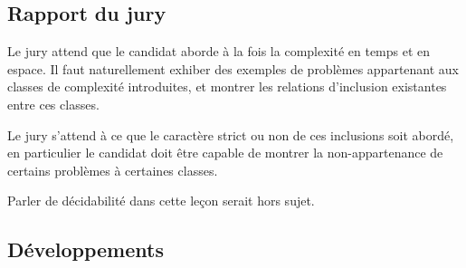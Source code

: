 \documentclass[../../agregation.tex]{subfiles}
\begin{document}

\subsection{Rapport du jury}

\begin{aquote}{}
Le jury attend que le candidat aborde à la fois la complexité en temps et en espace. Il faut naturellement exhiber des exemples de problèmes appartenant aux classes de complexité introduites, et montrer les relations d'inclusion existantes entre ces classes.

Le jury s'attend à ce que le caractère strict ou non de ces inclusions soit abordé, en particulier le candidat doit être capable de montrer la non-appartenance de certains problèmes à certaines classes.

Parler de décidabilité dans cette leçon serait hors sujet.
\end{aquote}

\subsection{Développements}

\dvts
\end{document}
